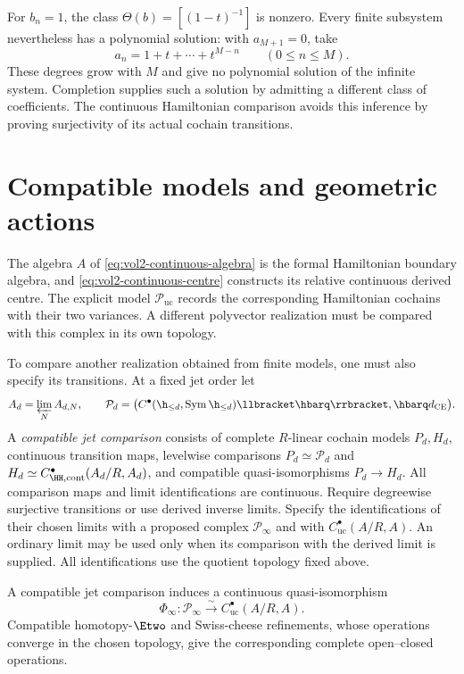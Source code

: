For $b_n=1$, the class $\Theta(b)=[(1-t)^{-1}]$ is nonzero.
Every finite subsystem nevertheless has a polynomial solution:
with $a_{M+1}=0$, take
\[
 a_n=1+t+\cdots+t^{M-n}\qquad(0\leq n\leq M).
\]
These degrees grow with $M$ and give no polynomial solution of the
infinite system. Completion supplies such a solution by admitting
a different class of coefficients. The continuous Hamiltonian
comparison avoids this inference by proving surjectivity of its
actual cochain transitions.

\section{Compatible models and geometric actions}

The algebra $A$ of \eqref{eq:vol2-continuous-algebra} is the formal
Hamiltonian boundary algebra, and \eqref{eq:vol2-continuous-centre}
constructs its relative continuous derived centre. The explicit
model $\mathcal P_{\mathrm{uc}}$ records the corresponding
Hamiltonian cochains with their two variances. A different
polyvector realization must be compared with this complex in its
own topology.

To compare another realization obtained from finite models, one
must also specify its transitions. At a fixed jet order let
\[
 A_d=\varprojlim_NA_{d,N},\qquad
 \mathcal P_d=
 \bigl(C^\bullet(\h_{\leq d},\operatorname{Sym}\h_{\leq d})
              \llbracket\hbarq\rrbracket,\hbarq d_{\mathrm{CE}}\bigr).
\]
A \emph{compatible jet comparison} consists of complete $R$-linear
cochain models $P_d,H_d$, continuous transition maps, levelwise comparisons
$P_d\simeq\mathcal P_d$ and
$H_d\simeq C^\bullet_{\HH,\mathrm{cont}}(A_d/R,A_d)$, and
compatible quasi-isomorphisms $P_d\to H_d$. All comparison maps
and limit identifications are continuous. Require degreewise
surjective transitions or use derived inverse limits. Specify the
identifications of their chosen limits with a proposed complex
$\mathcal P_\infty$ and with $C^\bullet_{\mathrm{uc}}(A/R,A)$.
An ordinary limit may be used only when its comparison with the
derived limit is supplied. All identifications use the quotient
topology fixed above.

\begin{theorem}
\label{thm:vol2-compatible-jets}
A compatible jet comparison induces a continuous quasi-isomorphism
\[
 \Phi_\infty:\mathcal P_\infty\xrightarrow{\sim}
                C^\bullet_{\mathrm{uc}}(A/R,A).
\]
Compatible homotopy-$\Etwo$ and Swiss-cheese refinements, whose
operations converge in the chosen topology, give the corresponding
complete open--closed operations.
\end{theorem}

